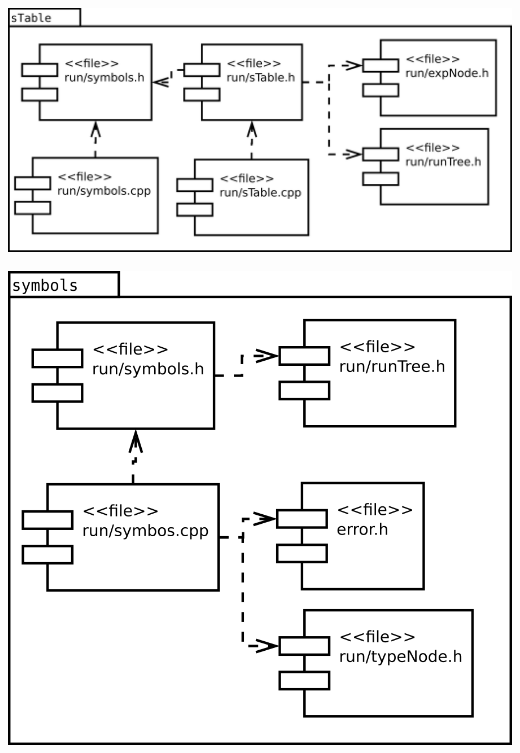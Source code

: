 \begin{multicols}{2}
\begin{center}
\includegraphics[scale=0.3]{files_arquitecture/sTable.png} \\
\end{center}
\begin{center}
\includegraphics[scale=0.3]{files_arquitecture/symbols.png} \\
\end{center}
\end{multicols}

